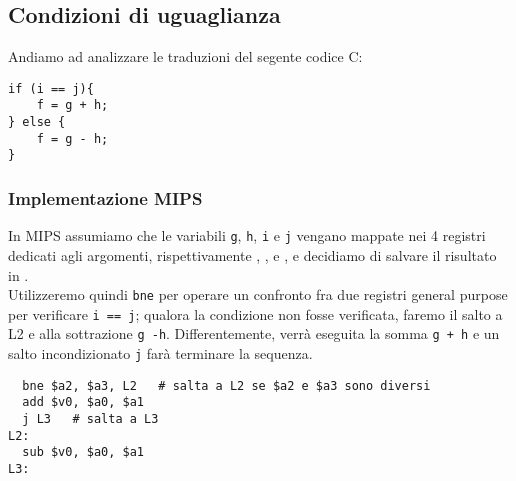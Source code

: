 \documentclass[class=book, crop=false, oneside]{standalone}
\begin{document}
\subsection*{Condizioni di uguaglianza}
Andiamo ad analizzare le traduzioni del segente codice C:
\begin{verbatim}
if (i == j){
	f = g + h;
} else {
	f = g - h;
}
\end{verbatim}
\subsubsection*{Implementazione MIPS}
In MIPS assumiamo che le variabili \texttt{g}, \texttt{h}, \texttt{i} e \texttt{j} vengano mappate nei 4 registri dedicati agli argomenti, rispettivamente , ,  e , e decidiamo di salvare il risultato in .\\
Utilizzeremo quindi \texttt{bne} per operare un confronto fra due registri general purpose per verificare \texttt{i == j}; qualora la condizione non fosse verificata, faremo il salto a L2 e alla sottrazione \texttt{g -h}. Differentemente, verrà eseguita la somma \texttt{g + h} e un salto incondizionato \texttt{j} farà terminare la sequenza.
\begin{verbatim}
  bne $a2, $a3, L2   # salta a L2 se $a2 e $a3 sono diversi
  add $v0, $a0, $a1
  j L3   # salta a L3
L2:
  sub $v0, $a0, $a1
L3:
\end{verbatim}
\end{document}
